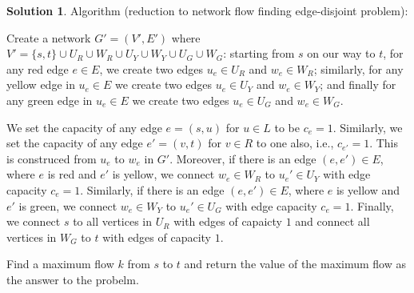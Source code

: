 \documentclass{article}
\theoremstyle{definition}
\newtheorem*{solution*}{Solution}
\newenvironment{solution}{\begin{solution*}}{{} \end{solution*}}
\begin{document}
	\medskip
		\begin{solution}
		Algorithm (reduction to network flow finding edge-disjoint problem):
		\item Create a network $G'=(V', E')$ where $V'=\{s, t\} \cup U_R\cup W_R \cup U_Y \cup W_Y \cup  U_G \cup W_G$: starting from $s$ on our way to $t$, for any red edge $e \in E$, we create two edges $u_e \in U_R$ and $w_e \in W_R$; similarly, for any yellow edge in $u_e \in E$ we create two edges $u_e \in U_Y$ and $w_e \in W_Y$; and finally for any green edge in $u_e \in E$ we create two edges $u_e \in U_G$ and $w_e \in W_G$.
		\item We set the capacity of any edge $e = (s, u)$ for $u \in L$ to be $c_e = 1$. Similarly,  we set the capacity of any edge $e'= (v, t)$ for $v \in R$ to one also, i.e., $c_{e'} = 1$. This is construced  from $u_e$ to $w_e$ in $G'$. Moreover, if there is an edge $(e, e') \in E$, where $e$ is red and $e'$ is yellow, we connect $w_e \in W_R$ to $u_e' \in U_Y$ with edge capacity $c_e = 1$. Similarly, if there is an edge $(e, e') \in E$, where $e$ is yellow and $e'$ is green, we connect $w_e \in W_Y$ to $u_e' \in U_G$ with edge capacity $c_e = 1$. Finally, we connect $s$ to all vertices in $U_R$ with edges of capaicty $1$ and connect all vertices in $W_G$ to $t$ with edges of capacity $1$. 
		\item Find a maximum flow $k$ from $s$ to $t$ and return the value of the maximum flow as the answer to the probelm.


\end{solution}
\end{document}
